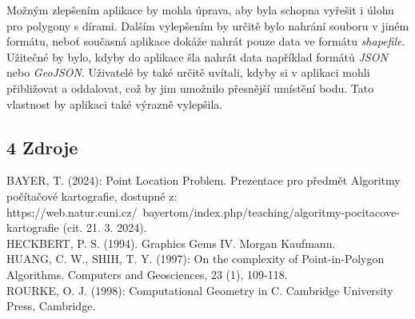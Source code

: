 \noindent Možným zlepšením aplikace by mohla úprava, aby byla schopna vyřešit i úlohu pro polygony s dírami. Dalším vylepšením by určitě bylo nahrání souboru v jiném formátu, neboť současná aplikace dokáže nahrát pouze data ve formátu \textit{shapefile}. Užitečné by bylo, kdyby do aplikace šla nahrát data například formátů \textit{JSON} nebo \textit{GeoJSON}. Uživatelé by také určitě uvítali, kdyby si v aplikaci mohli přibližovat a oddalovat, což by jim umožnilo přesnější umístění bodu. Tato vlastnost by aplikaci také výrazně vylepšila.

\newpage
\subsection*{4 Zdroje}

\noindent BAYER, T. (2024): Point Location Problem. Prezentace pro předmět Algoritmy počítačové kartografie, dostupné z: https://web.natur.cuni.cz/~bayertom/index.php/teaching/algoritmy-pocitacove-kartografie (cit. 21. 3. 2024).\\

\noindent HECKBERT, P. S. (1994). Graphics Gems IV. Morgan Kaufmann.\\

\noindent HUANG, C. W., SHIH, T. Y. (1997): On the complexity of Point-in-Polygon Algorithms. Computers and Geosciences, 23 (1), 109-118.\\

\noindent ROURKE, O. J. (1998): Computational Geometry in C. Cambridge University Press, Cambridge.






